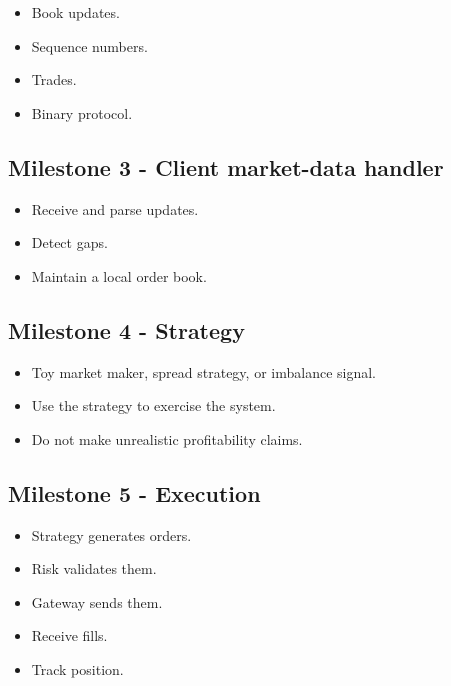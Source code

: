 \documentclass[11pt,letterpaper]{article}
\begin{document}
\begin{itemize}

\item Book updates.

\item Sequence numbers.

\item Trades.

\item Binary protocol.

\end{itemize}

\subsection*{Milestone 3 - Client market-data handler}

\begin{itemize}

\item Receive and parse updates.

\item Detect gaps.

\item Maintain a local order book.

\end{itemize}

\subsection*{Milestone 4 - Strategy}

\begin{itemize}

\item Toy market maker, spread strategy, or imbalance signal.

\item Use the strategy to exercise the system.

\item Do not make unrealistic profitability claims.

\end{itemize}

\subsection*{Milestone 5 - Execution}

\begin{itemize}

\item Strategy generates orders.

\item Risk validates them.

\item Gateway sends them.

\item Receive fills.

\item Track position.

\end{itemize}
\end{document}
